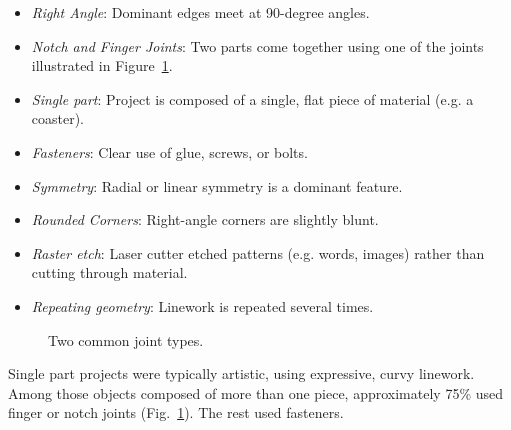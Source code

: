 \documentclass{article}
\begin{document}
\begin{itemize}
\item \textit{Right Angle}: Dominant edges meet at 90-degree angles.
\item \textit{Notch and Finger Joints}: Two parts come together using one of
  the joints illustrated in Figure~\ref{fig:joint}.
\item \textit{Single part}: Project is composed of a single, flat piece of
  material (e.g. a coaster).
\item \textit{Fasteners}: Clear use of glue, screws, or bolts.
\item \textit{Symmetry}: Radial or linear symmetry is a dominant feature.
\item \textit{Rounded Corners}: Right-angle corners are slightly blunt.
\item \textit{Raster etch}: Laser cutter etched patterns (e.g. words,
  images) rather than cutting through material.
\item \textit{Repeating geometry}: Linework is repeated several times.
\end{itemize}

\begin{figure}[h]
\centering 
{}
\caption{Two common joint types.}
\label{fig:joint}
\end{figure}

Single part projects were typically artistic, using expressive, curvy
linework. Among those objects composed of more than one piece,
approximately 75\% used finger or notch joints
(Fig.~\ref{fig:joint}). The rest used fasteners.
\end{document}

